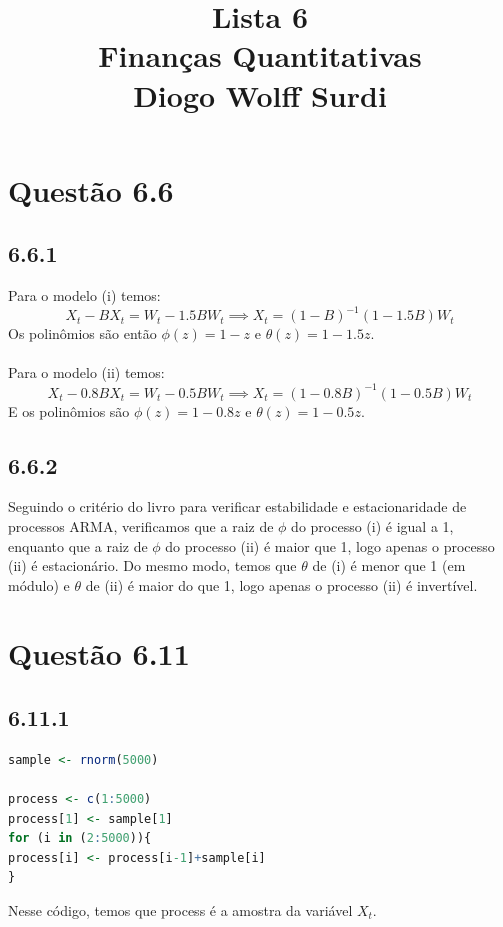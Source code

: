 \documentclass[12pt]{article}
\title{Lista 6\\
Finanças Quantitativas\\
Diogo Wolff Surdi}
\begin{document}
\maketitle

\section*{Questão 6.6}

\subsection*{6.6.1}
Para o modelo (i) temos:
\begin{equation*}
X_{t}-BX_{t}=W_{t}-1.5BW_{t} \implies X_{t}=(1-B)^{-1}(1-1.5B)W_{t}
\end{equation*}
Os polinômios são então $\phi(z)=1-z$ e $\theta(z)=1-1.5z$.\\\\
Para o modelo (ii) temos:
\begin{equation*}
X_{t}-0.8BX_{t}=W_{t}-0.5BW_{t} \implies X_{t}=(1-0.8B)^{-1}(1-0.5B)W_{t}
\end{equation*}
E os polinômios são $\phi(z)=1-0.8z$ e $\theta(z)=1-0.5z$.

\subsection*{6.6.2}
Seguindo o critério do livro para verificar estabilidade e estacionaridade de processos ARMA, verificamos que a raiz de $\phi$ do processo (i) é igual a 1, enquanto que a raiz de $\phi$ do processo (ii) é maior que 1, logo apenas o processo (ii) é estacionário. Do mesmo modo, temos que $\theta$ de (i) é menor que 1 (em módulo) e $\theta$ de (ii) é maior do que 1, logo apenas o processo (ii) é invertível.

\section*{Questão 6.11}

\subsection*{6.11.1}
\begin{lstlisting}[language=R]
sample <- rnorm(5000)

process <- c(1:5000)
process[1] <- sample[1]
for (i in (2:5000)){
process[i] <- process[i-1]+sample[i]
}
\end{lstlisting}
Nesse código, temos que process é a amostra da variável $X_{t}$. \\
\end{document}
